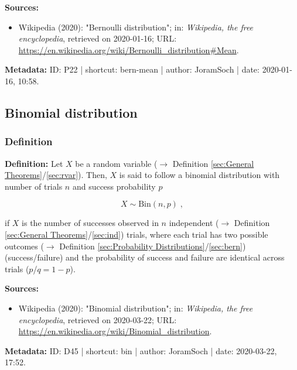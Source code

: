 \documentclass[a4paper,12pt,twoside]{book}
\begin{document}
\vspace{1em}
\textbf{Sources:}
\begin{itemize}
\item Wikipedia (2020): "Bernoulli distribution"; in: \textit{Wikipedia, the free encyclopedia}, retrieved on 2020-01-16; URL: \url{https://en.wikipedia.org/wiki/Bernoulli_distribution#Mean}.
\end{itemize}


\vspace{1em}
\textbf{Metadata:} ID: P22 | shortcut: bern-mean | author: JoramSoch | date: 2020-01-16, 10:58.
\vspace{1em}



\subsection{Binomial distribution}

\subsubsection[\textit{Definition}]{Definition} \label{sec:bin}
\setcounter{equation}{0}

\textbf{Definition:} Let $X$ be a random variable ($\rightarrow$ Definition \ref{sec:General Theorems}/\ref{sec:rvar}). Then, $X$ is said to follow a binomial distribution with number of trials $n$ and success probability $p$

\begin{equation} \label{eq:bin-bin}
X \sim \mathrm{Bin}(n, p) \; ,
\end{equation}

if $X$ is the number of successes observed in $n$ independent ($\rightarrow$ Definition \ref{sec:General Theorems}/\ref{sec:ind}) trials, where each trial has two possible outcomes ($\rightarrow$ Definition \ref{sec:Probability Distributions}/\ref{sec:bern}) (success/failure) and the probability of success and failure are identical across trials ($p$/$q = 1-p$).


\vspace{1em}
\textbf{Sources:}
\begin{itemize}
\item Wikipedia (2020): "Binomial distribution"; in: \textit{Wikipedia, the free encyclopedia}, retrieved on 2020-03-22; URL: \url{https://en.wikipedia.org/wiki/Binomial_distribution}.
\end{itemize}


\vspace{1em}
\textbf{Metadata:} ID: D45 | shortcut: bin | author: JoramSoch | date: 2020-03-22, 17:52.
\vspace{1em}
\end{document}
